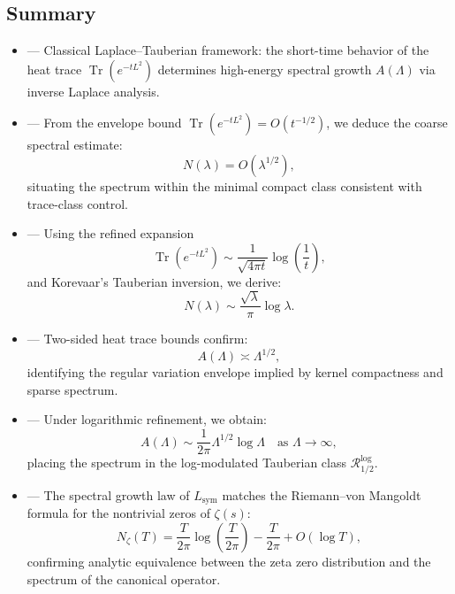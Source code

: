 \subsection*{Summary}

\begin{itemize}
  \item {} — Classical Laplace–Tauberian framework: the short-time behavior of the heat trace \( \operatorname{Tr}(e^{-tL^2}) \) determines high-energy spectral growth \( A(\Lambda) \) via inverse Laplace analysis.

  \item {} — From the envelope bound \( \operatorname{Tr}(e^{-t L^2}) = O(t^{-1/2}) \), we deduce the coarse spectral estimate:
  \[
  N(\lambda) = O(\lambda^{1/2}),
  \]
  situating the spectrum within the minimal compact class consistent with trace-class control.

  \item {} — Using the refined expansion
  \[
  \operatorname{Tr}(e^{-t L^2}) \sim \frac{1}{\sqrt{4\pi t}} \log\left( \frac{1}{t} \right),
  \]
  and Korevaar’s Tauberian inversion, we derive:
  \[
  N(\lambda) \sim \frac{\sqrt{\lambda}}{\pi} \log \lambda.
  \]

  \item {} — Two-sided heat trace bounds confirm:
  \[
  A(\Lambda) \asymp \Lambda^{1/2},
  \]
  identifying the regular variation envelope implied by kernel compactness and sparse spectrum.

  \item {} — Under logarithmic refinement, we obtain:
  \[
  A(\Lambda) \sim \frac{1}{2\pi} \Lambda^{1/2} \log \Lambda
  \quad \text{as } \Lambda \to \infty,
  \]
  placing the spectrum in the log-modulated Tauberian class \( \mathcal{R}_{1/2}^{\log} \).

  \item {} — The spectral growth law of \( L_{\mathrm{sym}} \) matches the Riemann–von Mangoldt formula for the nontrivial zeros of \( \zeta(s) \):
  \[
  N_\zeta(T) = \frac{T}{2\pi} \log\left( \frac{T}{2\pi} \right) - \frac{T}{2\pi} + O(\log T),
  \]
  confirming analytic equivalence between the zeta zero distribution and the spectrum of the canonical operator.
\end{itemize}

